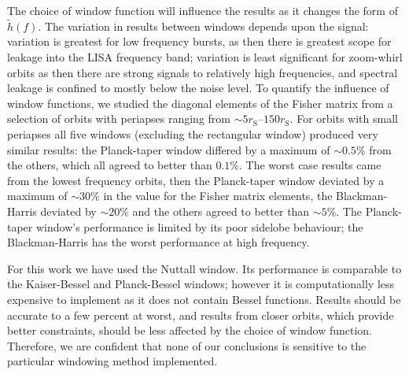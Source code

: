 \documentclass[useAMS,usedcolumn,usegraphicx,usenatbib]{mn2e}
\newcommand{\sub}[1]{\ensuremath{_\mathrm{#1}}}
\begin{document}
The choice of window function will influence the results as it changes the form of $\widetilde{h}(f)$. The variation in results between windows depends upon the signal: variation is greatest for low frequency bursts, as then there is greatest scope for leakage into the LISA frequency band; variation is least significant for zoom-whirl orbits as then there are strong signals to relatively high frequencies, and spectral leakage is confined to mostly below the noise level. To quantify the influence of window functions, we studied the diagonal elements of the Fisher matrix from a selection of orbits with periapses ranging from $\sim 5 r\sub{S}$--$150 r\sub{S}$. For orbits with small periapses all five windows (excluding the rectangular window) produced very similar results: the Planck-taper window differed by a maximum of $\sim 0.5\%$ from the others, which all agreed to better than $0.1\%$. The worst case results came from the lowest frequency orbits, then the Planck-taper window deviated by a maximum of $\sim 30\%$ in the value for the Fisher matrix elements, the Blackman-Harris deviated by $\sim 20\%$ and the others agreed to better than $\sim 5\%$. The Planck-taper window's performance is limited by its poor sidelobe behaviour; the Blackman-Harris has the worst performance at high frequency.

For this work we have used the Nuttall window. Its performance is comparable to the Kaiser-Bessel and Planck-Bessel windows; however it is computationally less expensive to implement as it does not contain Bessel functions. Results should be accurate to a few percent at worst, and results from closer orbits, which provide better constraints, should be less affected by the choice of window function. Therefore, we are confident that none of our conclusions is sensitive to the particular windowing method implemented.

\bsp

\label{lastpage}
\end{document}
